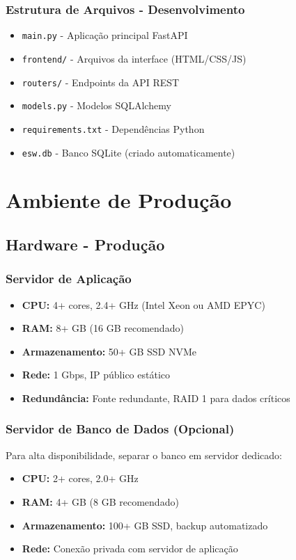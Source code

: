 \documentclass[12pt,a4paper]{article}
\begin{document}
\subsubsection{Estrutura de Arquivos - Desenvolvimento}
\begin{itemize}
    \item \texttt{main.py} - Aplicação principal FastAPI
    \item \texttt{frontend/} - Arquivos da interface (HTML/CSS/JS)
    \item \texttt{routers/} - Endpoints da API REST
    \item \texttt{models.py} - Modelos SQLAlchemy
    \item \texttt{requirements.txt} - Dependências Python
    \item \texttt{esw.db} - Banco SQLite (criado automaticamente)
\end{itemize}

\section{Ambiente de Produção}

\subsection{Hardware - Produção}
\subsubsection{Servidor de Aplicação}
\begin{itemize}
    \item \textbf{CPU:} 4+ cores, 2.4+ GHz (Intel Xeon ou AMD EPYC)
    \item \textbf{RAM:} 8+ GB (16 GB recomendado)
    \item \textbf{Armazenamento:} 50+ GB SSD NVMe
    \item \textbf{Rede:} 1 Gbps, IP público estático
    \item \textbf{Redundância:} Fonte redundante, RAID 1 para dados críticos
\end{itemize}

\subsubsection{Servidor de Banco de Dados (Opcional)}
Para alta disponibilidade, separar o banco em servidor dedicado:
\begin{itemize}
    \item \textbf{CPU:} 2+ cores, 2.0+ GHz
    \item \textbf{RAM:} 4+ GB (8 GB recomendado)
    \item \textbf{Armazenamento:} 100+ GB SSD, backup automatizado
    \item \textbf{Rede:} Conexão privada com servidor de aplicação
\end{itemize}
\end{document}
